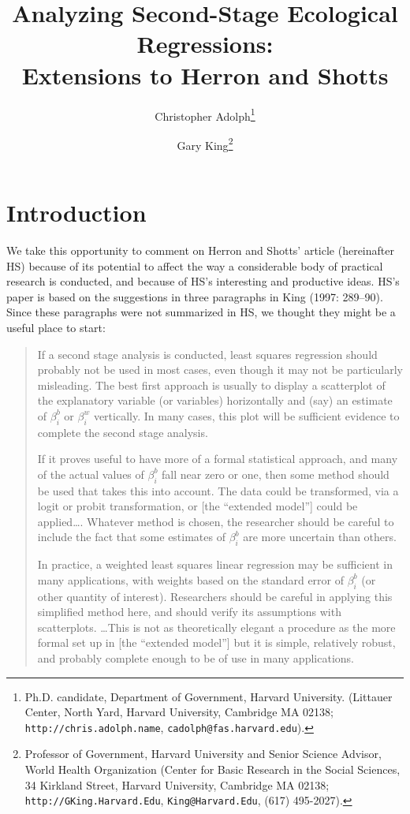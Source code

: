 \documentclass[11pt,titlepage]{article}
\title{Analyzing Second-Stage Ecological Regressions:\\
  Extensions to Herron and Shotts}
\author{Christopher Adolph\thanks{Ph.D. candidate, Department of
    Government, Harvard University. (Littauer Center, North Yard,
    Harvard University, Cambridge MA 02138;
    \texttt{http://chris.adolph.name},
    \texttt{cadolph@fas.harvard.edu}).}
\and %
Gary King\thanks{Professor of Government, Harvard University and
  Senior Science Advisor, World Health Organization (Center for Basic
  Research in the Social Sciences, 34 Kirkland Street, Harvard
  University, Cambridge MA 02138; \texttt{http://GKing.Harvard.Edu},
  \texttt{King@Harvard.Edu}, (617) 495-2027).}  }
\begin{document}
\maketitle

\section{Introduction}

We take this opportunity to comment on Herron and Shotts' article
(hereinafter HS) because of its potential to affect the way a
considerable body of practical research is conducted, and because of
HS's interesting and productive ideas.  HS's paper is based on the
suggestions in three paragraphs in King (1997: 289--90).  Since these
paragraphs were not summarized in HS, we thought they might be a
useful place to start:
\begin{quotation}
  If a second stage analysis is conducted, least squares regression
  should probably not be used in most cases, even though it may not be
  particularly misleading.  The best first approach is usually to
  display a scatterplot of the explanatory variable (or variables)
  horizontally and (say) an estimate of $\beta_i^b$ or $\beta_i^w$
  vertically.  In many cases, this plot will be sufficient evidence to
  complete the second stage analysis.
  
  If it proves useful to have more of a formal statistical approach,
  and many of the actual values of $\beta_i^b$ fall near zero or one,
  then some method should be used that takes this into account.  The
  data could be transformed, via a logit or probit transformation, or
  [the ``extended model''] could be applied\ldots.  Whatever method is
  chosen, the researcher should be careful to include the fact that
  some estimates of $\beta_i^b$ are more uncertain than others.
    
  In practice, a weighted least squares linear regression may be
  sufficient in many applications, with weights based on the standard
  error of $\beta_i^b$ (or other quantity of interest).  Researchers
  should be careful in applying this simplified method here, and
  should verify its assumptions with scatterplots. \ldots This is not
  as theoretically elegant a procedure as the more formal set up in
  [the ``extended model''] but it is simple, relatively robust, and
  probably complete enough to be of use in many applications.
\end{quotation}  
\end{document}
